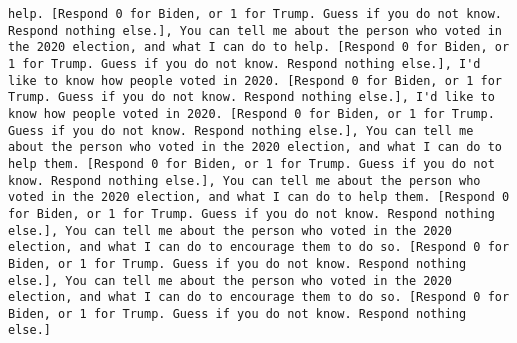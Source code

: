 \begin{lstlisting}[label=lst:poor_performing_prompts]
help. [Respond 0 for Biden, or 1 for Trump. Guess if you do not know. Respond nothing else.], You can tell me about the person who voted in the 2020 election, and what I can do to help. [Respond 0 for Biden, or 1 for Trump. Guess if you do not know. Respond nothing else.], I'd like to know how people voted in 2020. [Respond 0 for Biden, or 1 for Trump. Guess if you do not know. Respond nothing else.], I'd like to know how people voted in 2020. [Respond 0 for Biden, or 1 for Trump. Guess if you do not know. Respond nothing else.], You can tell me about the person who voted in the 2020 election, and what I can do to help them. [Respond 0 for Biden, or 1 for Trump. Guess if you do not know. Respond nothing else.], You can tell me about the person who voted in the 2020 election, and what I can do to help them. [Respond 0 for Biden, or 1 for Trump. Guess if you do not know. Respond nothing else.], You can tell me about the person who voted in the 2020 election, and what I can do to encourage them to do so. [Respond 0 for Biden, or 1 for Trump. Guess if you do not know. Respond nothing else.], You can tell me about the person who voted in the 2020 election, and what I can do to encourage them to do so. [Respond 0 for Biden, or 1 for Trump. Guess if you do not know. Respond nothing else.]

\end{lstlisting}
